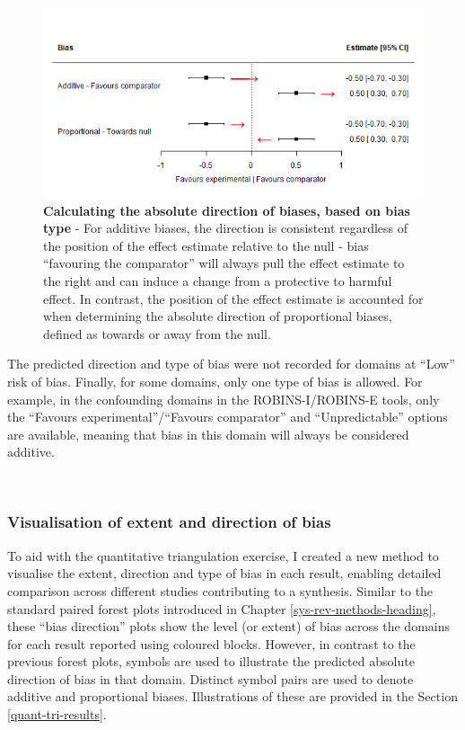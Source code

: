 \documentclass[a4paper, twoside]{templates/ociamthesis}
\begin{document}
\begin{figure}[H]
\includegraphics[width=1\linewidth]{figures/tri/exampleDirection} \caption[Illustration of calculating the absolute direction of biases, based on bias type]{\textbf{Calculating the absolute direction of biases, based on bias type} - For additive biases, the direction is consistent regardless of the position of the effect estimate relative to the null - bias ``favouring the comparator'' will always pull the effect estimate to the right and can induce a change from a protective to harmful effect. In contrast, the position of the effect estimate is accounted for when determining the absolute direction of proportional biases, defined as towards or away from the null.}\label{fig:exampleDirection}
\end{figure}

The predicted direction and type of bias were not recorded for domains at ``Low'' risk of bias. Finally, for some domains, only one type of bias is allowed. For example, in the confounding domains in the ROBINS-I/ROBINS-E tools, only the ``Favours experimental''/``Favours comparator'' and ``Unpredictable'' options are available, meaning that bias in this domain will always be considered additive.

~

\hypertarget{visualisation-of-extent-and-direction-of-bias}{%
\subsubsection{Visualisation of extent and direction of bias}\label{visualisation-of-extent-and-direction-of-bias}}

To aid with the quantitative triangulation exercise, I created a new method to visualise the extent, direction and type of bias in each result, enabling detailed comparison across different studies contributing to a synthesis. Similar to the standard paired forest plots introduced in Chapter \ref{sys-rev-methods-heading}, these ``bias direction'' plots show the level (or extent) of bias across the domains for each result reported using coloured blocks. However, in contrast to the previous forest plots, symbols are used to illustrate the predicted absolute direction of bias in that domain. Distinct symbol pairs are used to denote additive and proportional biases. Illustrations of these are provided in the Section \ref{quant-tri-results}.
\end{document}
